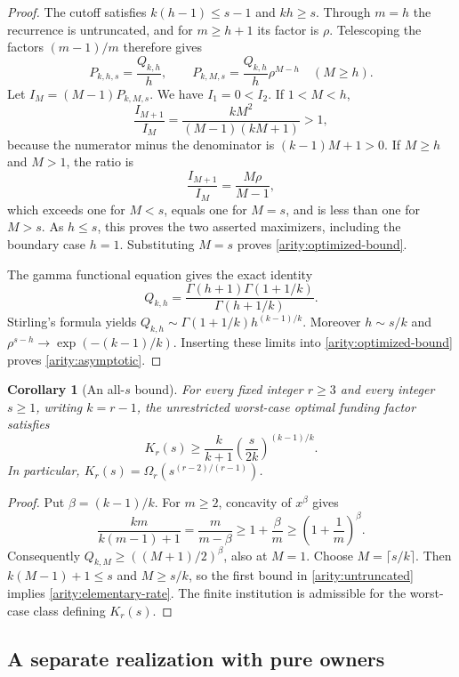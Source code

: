 \documentclass[11pt]{article}
\newtheorem{corollary}[theorem]{Corollary}
\theoremstyle{definition}\newtheorem{definition}[theorem]{Definition}
\theoremstyle{remark}\newtheorem{remark}[theorem]{Remark}
\begin{document}
\begin{proof}
The cutoff satisfies $k(h-1)\leq s-1$ and $kh\geq s$.  Through $m=h$ the
recurrence is untruncated, and for $m\geq h+1$ its factor is $\rho$.
Telescoping the factors $(m-1)/m$ therefore gives
\[
  P_{k,h,s}=\frac{Q_{k,h}}{h},\qquad
  P_{k,M,s}=\frac{Q_{k,h}}{h}\rho^{M-h}\quad(M\geq h).
\]
Let $I_M=(M-1)P_{k,M,s}$.  We have $I_1=0<I_2$.  If $1<M<h$,
\[
  \frac{I_{M+1}}{I_M}
  =\frac{kM^2}{(M-1)(kM+1)}>1,
\]
because the numerator minus the denominator is $(k-1)M+1>0$.  If
$M\geq h$ and $M>1$, the ratio is
\[
  \frac{I_{M+1}}{I_M}=\frac{M\rho}{M-1},
\]
which exceeds one for $M<s$, equals one for $M=s$, and is less than one
for $M>s$.  As $h\leq s$, this proves the two asserted maximizers, including
the boundary case $h=1$.  Substituting $M=s$ proves
\eqref{arity:optimized-bound}.

The gamma functional equation gives the exact identity
\[
  Q_{k,h}
  =\frac{\Gamma(h+1)\Gamma(1+1/k)}{\Gamma(h+1/k)}.
\]
Stirling's formula yields
$Q_{k,h}\sim\Gamma(1+1/k)h^{(k-1)/k}$.  Moreover $h\sim s/k$ and
$\rho^{s-h}\longrightarrow\exp(-(k-1)/k)$.
Inserting these limits into \eqref{arity:optimized-bound} proves
\eqref{arity:asymptotic}.
\end{proof}

\begin{corollary}[An all-$s$ bound]
\label{arity:all-s}
For every fixed integer $r\geq3$ and every integer $s\geq1$, writing
$k=r-1$, the unrestricted worst-case optimal funding factor satisfies
\begin{equation}
  K_r(s)\geq
  \frac{k}{k+1}\left(\frac{s}{2k}\right)^{(k-1)/k}.
  \label{arity:elementary-rate}
\end{equation}
In particular,
$K_r(s)=\Omega_r(s^{(r-2)/(r-1)})$.
\end{corollary}

\begin{proof}
Put $\beta=(k-1)/k$.  For $m\geq2$, concavity of $x^\beta$ gives
\[
  \frac{km}{k(m-1)+1}
    =\frac{m}{m-\beta}
    \geq1+\frac{\beta}{m}
    \geq\left(1+\frac1m\right)^\beta.
\]
Consequently $Q_{k,M}\geq((M+1)/2)^\beta$, also at $M=1$.
Choose $M=\lceil s/k\rceil$.  Then
$k(M-1)+1\leq s$ and $M\geq s/k$, so the first bound in
\eqref{arity:untruncated} implies \eqref{arity:elementary-rate}.
The finite institution is admissible for the worst-case class defining
$K_r(s)$.
\end{proof}

\subsection{A separate realization with pure owners}
\label{arity:pure-section}
\end{document}
